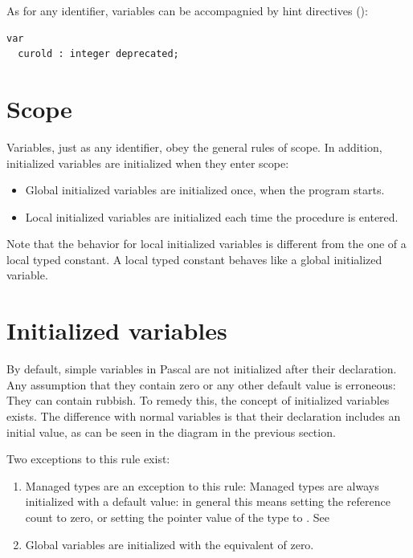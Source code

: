 As for any identifier, variables can be accompagnied by hint directives
():
\begin{verbatim}
var
  curold : integer deprecated;
\end{verbatim}

\section{Scope}
Variables, just as any identifier, obey the general rules of scope.
In addition, initialized variables are initialized when they enter scope:
\begin{itemize}
\item Global initialized variables are initialized once, when the program starts.
\item Local initialized variables are initialized each time the procedure is
entered.
\end{itemize}
Note that the behavior for local initialized variables is different from
the one of a local typed constant. A local typed constant behaves like a
global initialized variable.

\section{Initialized variables}
\label{se:initializedvars}
By default, simple variables in Pascal are not initialized after their declaration.
Any assumption that they contain zero or any other default value is erroneous:
They can contain rubbish. To remedy this, the concept of initialized variables
exists. The difference with normal variables is that their declaration includes
an initial value, as can be seen in the diagram in the previous section.

\begin{remark}
Two exceptions to this rule exist:
\begin{enumerate}
\item Managed types are an exception to this rule: Managed types are always
initialized with a default value: in general this means setting the reference
count to zero, or setting the pointer value of the type to .
See 
\item Global variables are initialized with the equivalent of zero.
\end{enumerate}
\end{remark}

